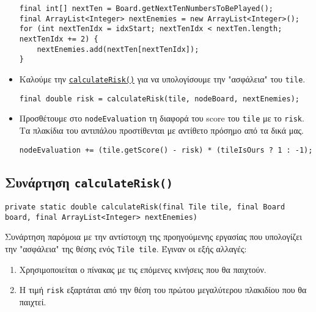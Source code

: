 \begin{itemize}
\begin{lstlisting}[style=chunk]
final int[] nextTen = Board.getNextTenNumbersToBePlayed();
final ArrayList<Integer> nextEnemies = new ArrayList<Integer>();
for (int nextTenIdx = idxStart; nextTenIdx < nextTen.length; nextTenIdx += 2) {
    nextEnemies.add(nextTen[nextTenIdx]);
}
\end{lstlisting}

\item Καλούμε την
\hyperref[fun:calculateRisk]{\lstinline!calculateRisk()!}
για να υπολογίσουμε την "ασφάλεια" του \lstinline!tile!.
\begin{lstlisting}[style=chunk]
final double risk = calculateRisk(tile, nodeBoard, nextEnemies);
\end{lstlisting}

\item Προσθέτουμε στο \lstinline!nodeEvaluation! τη διαφορά του score του \lstinline!tile! με το \lstinline!risk!.
Τα πλακίδια του αντιπάλου προστίθενται με αντίθετο πρόσημο από τα δικά μας.
\begin{lstlisting}[style=chunk]
nodeEvaluation += (tile.getScore() - risk) * (tileIsOurs ? 1 : -1);
\end{lstlisting}
\end{itemize}

\subsection{Συνάρτηση \texttt{calculateRisk()}}\label{fun:calculateRisk}
\begin{lstlisting}[style=declaration]
private static double calculateRisk(final Tile tile, final Board board, final ArrayList<Integer> nextEnemies)
\end{lstlisting}
Συνάρτηση παρόμοια με την αντίστοιχη της προηγούμενης εργασίας που υπολογίζει την "ασφάλεια" της θέσης ενός \lstinline!Tile tile!.
Έγιναν οι εξής αλλαγές:
\begin{enumerate}
\item Χρησιμοποιείται ο πίνακας με τις επόμενες κινήσεις που θα παιχτούν.

\item Η τιμή \lstinline!risk! εξαρτάται από την θέση του πρώτου μεγαλύτερου πλακιδίου που θα παιχτεί.
\end{enumerate}

